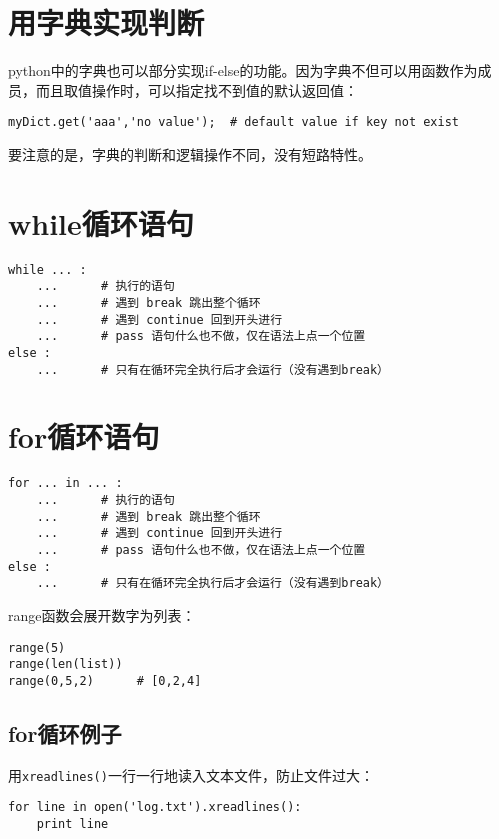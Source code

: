 \section{用字典实现判断}

python中的字典也可以部分实现if-else的功能。因为字典不但可以用函数作为成员，而且取值操作时，可以指定找不到值的默认返回值：

\begin{lstlisting}
myDict.get('aaa','no value');  # default value if key not exist
\end{lstlisting}

要注意的是，字典的判断和逻辑操作不同，没有短路特性。

\section{while循环语句}

\begin{lstlisting}
while ... :
	...      # 执行的语句
	...      # 遇到 break 跳出整个循环
	...      # 遇到 continue 回到开头进行
	...      # pass 语句什么也不做，仅在语法上点一个位置
else :
	...      # 只有在循环完全执行后才会运行（没有遇到break）
\end{lstlisting}

\section{for循环语句}

\begin{lstlisting}
for ... in ... :
	...      # 执行的语句
	...      # 遇到 break 跳出整个循环
	...      # 遇到 continue 回到开头进行
	...      # pass 语句什么也不做，仅在语法上点一个位置
else :
	...      # 只有在循环完全执行后才会运行（没有遇到break）
\end{lstlisting}

range函数会展开数字为列表：
\begin{lstlisting}
range(5)
range(len(list))
range(0,5,2)      # [0,2,4]
\end{lstlisting}

\subsection{for循环例子}

用\verb|xreadlines()|一行一行地读入文本文件，防止文件过大：

\begin{lstlisting}
for line in open('log.txt').xreadlines():
	print line
\end{lstlisting}

